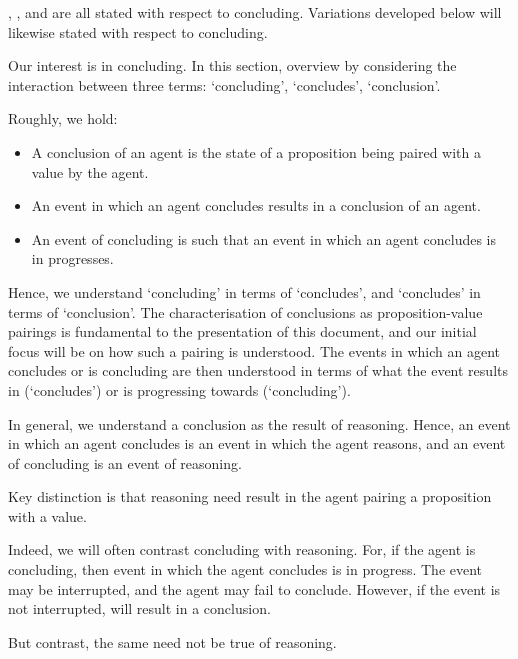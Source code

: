 \begin{note}
  \qWhy{}, \qHow{}, and \issueInclusion{} are all stated with respect to concluding.
  Variations developed below will likewise stated with respect to concluding.
\end{note}

\begin{note}
  Our interest is in concluding.
  In this section, overview by considering the interaction between three terms:
  `concluding', `concludes', `conclusion'.

  Roughly, we hold:

  \begin{itemize}
  \item
    A conclusion of an agent is the state of a proposition being paired with a value by the agent.
  \item
    An event in which an agent concludes results in a conclusion of an agent.
  \item
    An event of concluding is such that an event in which an agent concludes is in progresses.
  \end{itemize}

  Hence, we understand `concluding' in terms of `concludes', and `concludes' in terms of `conclusion'.
  The characterisation of conclusions as proposition-value pairings is fundamental to the presentation of this document, and our initial focus will be on how such a pairing is understood.
  The events in which an agent concludes or is concluding are then understood in terms of what the event results in (`concludes') or is progressing towards (`concluding').

  In general, we understand a conclusion as the result of reasoning.
  Hence, an event in which an agent concludes is an event in which the agent reasons, and an event of concluding is an event of reasoning.

  Key distinction is that reasoning need result in the agent pairing a proposition with a value.

  Indeed, we will often contrast concluding with reasoning.
  For, if the agent is concluding, then event in which the agent concludes is in progress.
  The event may be interrupted, and the agent may fail to conclude.
  However, if the event is not interrupted, will result in a conclusion.

  But contrast, the same need not be true of reasoning.
\end{note}

